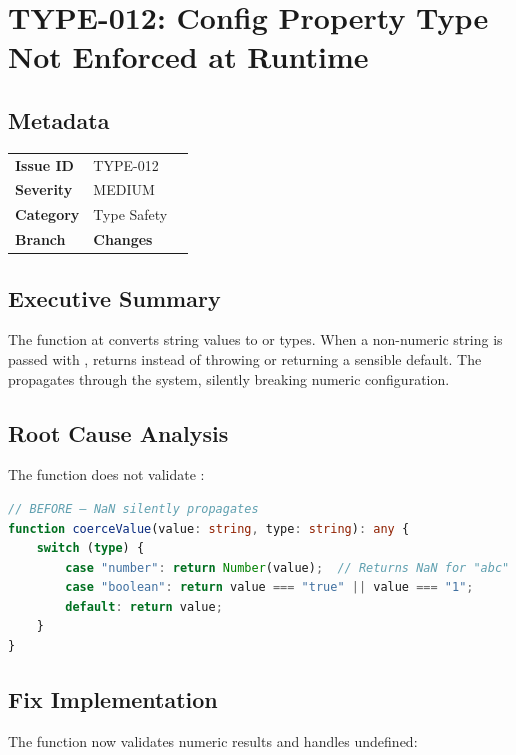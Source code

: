 \section{TYPE-012: Config Property Type Not Enforced at Runtime}
\label{sec:type-012}
\subsection*{Metadata}
\begin{tabular}{ll}
\textbf{Issue ID} & TYPE-012 \\
\textbf{Severity} & MEDIUM \\
\textbf{Category} & Type Safety \\
\textbf{Branch} & 
\textbf{Changes} &  \\
\end{tabular}

\subsection*{Executive Summary}
The  function at  converts string values to  or  types. When a non-numeric string is passed with ,  returns  instead of throwing or returning a sensible default. The  propagates through the system, silently breaking numeric configuration.

\subsection*{Root Cause Analysis}
The function does not validate :

\begin{lstlisting}[language=TypeScript]
// BEFORE — NaN silently propagates
function coerceValue(value: string, type: string): any {
    switch (type) {
        case "number": return Number(value);  // Returns NaN for "abc"
        case "boolean": return value === "true" || value === "1";
        default: return value;
    }
}
\end{lstlisting}

\subsection*{Fix Implementation}
The function now validates numeric results and handles undefined:

